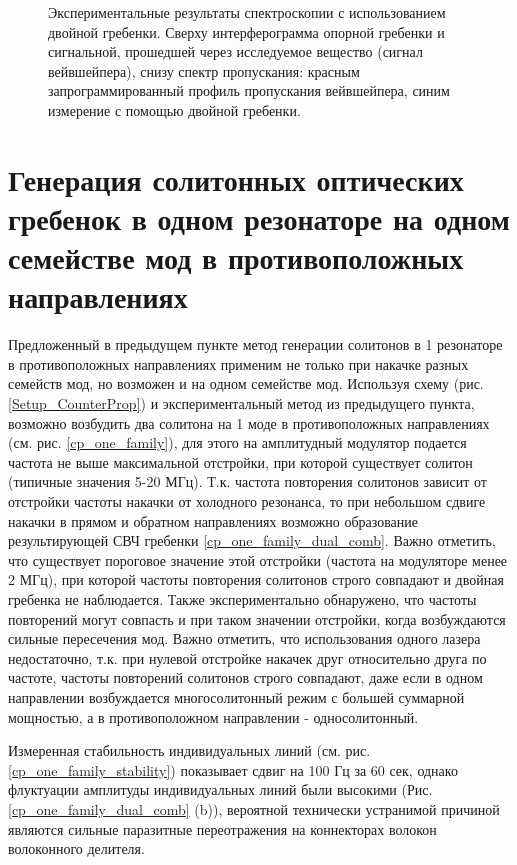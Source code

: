 \begin{figure}[!htb]
\begin{minipage}{1\linewidth}
\end{minipage}
\caption{Экспериментальные результаты спектроскопии с использованием двойной гребенки. Сверху интерферограмма опорной гребенки и сигнальной, прошедшей через исследуемое вещество (сигнал вейвшейпера), снизу спектр пропускания: красным запрограммированный профиль пропускания вейвшейпера, синим измерение с помощью двойной гребенки.}
\label{fig3_spectroscopy}
\end{figure}


\section{Генерация солитонных оптических гребенок в одном резонаторе на одном семействе мод в противоположных направлениях}

Предложенный в предыдущем пункте метод генерации солитонов в 1 резонаторе в противоположных направлениях применим не только при накачке разных семейств мод, но возможен и на одном семействе мод. Используя схему (рис. \ref{Setup_CounterProp}) и экспериментальный метод из предыдущего пункта, возможно возбудить два солитона на 1 моде в противоположных направлениях (см. рис. \ref{cp_one_family}), для этого на амплитудный модулятор подается частота не выше максимальной отстройки, при которой существует солитон (типичные значения 5-20 МГц). Т.к. частота повторения солитонов зависит от отстройки частоты накачки от холодного резонанса, то при небольшом сдвиге накачки в прямом и обратном направлениях возможно образование результирующей СВЧ гребенки \ref{cp_one_family_dual_comb}. Важно отметить, что существует пороговое значение этой отстройки (частота на модуляторе менее 2 МГц), при которой частоты повторения солитонов строго совпадают и двойная гребенка не наблюдается. Также экспериментально обнаружено, что частоты повторений могут совпасть и при таком значении отстройки, когда возбуждаются сильные пересечения мод. Важно отметить, что использования одного лазера недостаточно, т.к. при нулевой отстройке накачек друг относительно друга по частоте, частоты повторений солитонов строго совпадают, даже если в одном направлении возбуждается многосолитонный режим с большей суммарной мощностью, а в противоположном направлении - односолитонный.

Измеренная стабильность индивидуальных линий (см. рис. \ref{cp_one_family_stability}) показывает сдвиг на 100 Гц за 60 сек, однако флуктуации амплитуды индивидуальных линий были высокими (Рис. \ref{cp_one_family_dual_comb} (b)), вероятной технически устранимой причиной являются сильные паразитные переотражения на коннекторах волокон волоконного делителя.

